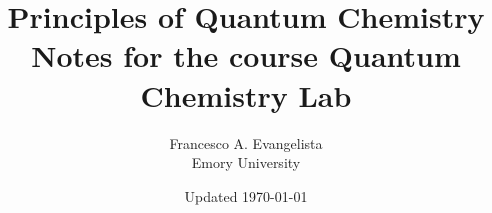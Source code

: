 \documentclass[12pt]{../Main/lecturenotes}
\title{\Huge \headingfont 
    \fontsize{42pt}{48pt} \textbf{Principles of Quantum Chemistry} \\
    \vspace{1in}
    {Notes for the course Quantum Chemistry Lab}
    \vspace{1in}
}
\author{\headingfont \Large  Francesco A. Evangelista \vspace{.125in} \\ \headingfont Emory University }
\date{\headingfont Updated \today}
\begin{document}
\maketitle

\pagebreak

\tableofcontents

\newpage



\graphicspath{{../01-Basics/}}


\graphicspath{{../02-BornOppenheimer/}}


\graphicspath{{../03-Hartree-Fock/}}


\graphicspath{{../04-BasisSets/}}


\graphicspath{{../05-StationaryPoints/}}


\graphicspath{{../06-DFT/}}


\graphicspath{{../07-OpenShells/}}


\graphicspath{{../08-TransitionStates/}}


\graphicspath{{../09-CorrelatedMethods/}}


\graphicspath{{../10-Thermochemistry/}}


\graphicspath{{../11-ExcitedStates}}


\graphicspath{{../12-ModelingInteractions/}}

%
\end{document}
